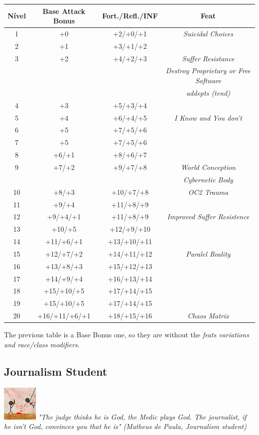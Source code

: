 \documentclass[ letterpaper,12pt]{article}
\begin{document}
\begin{center} \begin{tabular}{|c||c|c|c|}
\hline
{\bf Nível}&{\bf Base Attack Bonus}&{\bf Fort./Refl./INF}&{\bf Feat}\\
\hline
1&+0&+2/+0/+1&{\it Suicidal Choices}\\
\hline
2&+1&+3/+1/+2&\\
\hline
3&+2&+4/+2/+3&{\it Suffer Resistance}\\
&&&{\it Destroy Proprietary or Free Software}\\
&&&{\it addepts (tend)}\\
\hline
4&+3&+5/+3/+4&\\
\hline
5&+4&+6/+4/+5&{\it I Know and You don't}\\
\hline
6&+5&+7/+5/+6&\\
\hline
7&+5&+7/+5/+6&{}\\
\hline
8&+6/+1&+8/+6/+7&\\
\hline
9&+7/+2&+9/+7/+8&{\it World Conception}\\
&&&{\it Cybernetic Body}\\
\hline
10&+8/+3&+10/+7/+8&{\it OC2 Trauma}\\
\hline
11&+9/+4&+11/+8/+9&\\
\hline
12&+9/+4/+1&+11/+8/+9&{\it Improved Suffer Resistence}\\
\hline
13&+10/+5&+12/+9/+10&\\
\hline
14&+11/+6/+1&+13/+10/+11&\\
\hline
15&+12/+7/+2&+14/+11/+12&{\it Paralel Reality}\\
\hline
16&+13/+8/+3&+15/+12/+13&\\
\hline
17&+14/+9/+4&+16/+13/+14&\\
\hline
18&+15/+10/+5&+17/+14/+15&\\
\hline
19&+15/+10/+5&+17/+14/+15&\\
\hline
20&+16/+11/+6/+1&+18/+15/+16&{\it Chaos Matrix}\\
\hline
\end{tabular} \end{center}

The previous table is a Base Bonus one, so they are without the {\it feats variations and race/class modifiers}.\\

\subsection{Journalism Student}
\includegraphics{../data/classes/Img/jornalismo.png}
{\it "The judge thinks he is God, the Medic plays God. The journalist, if he isn't God, convinces you that he is" (Matheus de Paula, Journalism student)}\\
\end{document}
